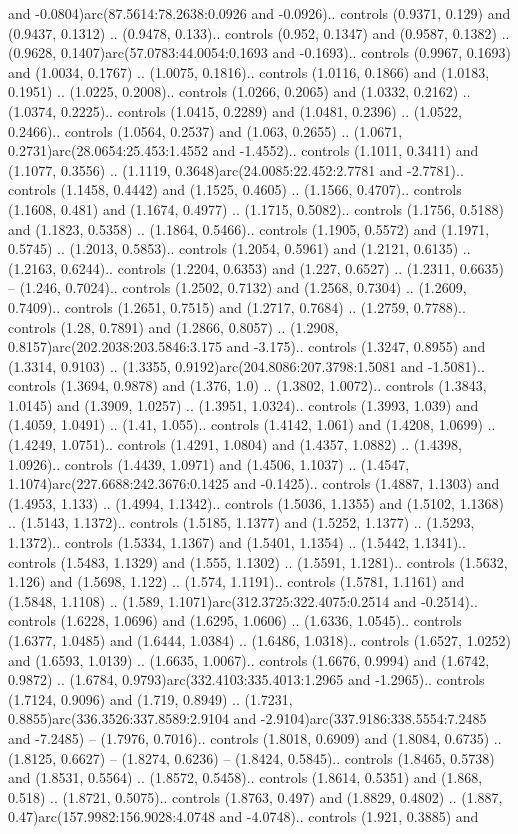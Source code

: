 and -0.0804)arc(87.5614:78.2638:0.0926 and -0.0926).. controls (0.9371, 0.129) and (0.9437, 0.1312) .. (0.9478, 0.133).. controls (0.952, 0.1347) and (0.9587, 0.1382) .. (0.9628, 0.1407)arc(57.0783:44.0054:0.1693 and -0.1693).. controls (0.9967, 0.1693) and (1.0034, 0.1767) .. (1.0075, 0.1816).. controls (1.0116, 0.1866) and (1.0183, 0.1951) .. (1.0225, 0.2008).. controls (1.0266, 0.2065) and (1.0332, 0.2162) .. (1.0374, 0.2225).. controls (1.0415, 0.2289) and (1.0481, 0.2396) .. (1.0522, 0.2466).. controls (1.0564, 0.2537) and (1.063, 0.2655) .. (1.0671, 0.2731)arc(28.0654:25.453:1.4552 and -1.4552).. controls (1.1011, 0.3411) and (1.1077, 0.3556) .. (1.1119, 0.3648)arc(24.0085:22.452:2.7781 and -2.7781).. controls (1.1458, 0.4442) and (1.1525, 0.4605) .. (1.1566, 0.4707).. controls (1.1608, 0.481) and (1.1674, 0.4977) .. (1.1715, 0.5082).. controls (1.1756, 0.5188) and (1.1823, 0.5358) .. (1.1864, 0.5466).. controls (1.1905, 0.5572) and (1.1971, 0.5745) .. (1.2013, 0.5853).. controls (1.2054, 0.5961) and (1.2121, 0.6135) .. (1.2163, 0.6244).. controls (1.2204, 0.6353) and (1.227, 0.6527) .. (1.2311, 0.6635) -- (1.246, 0.7024).. controls (1.2502, 0.7132) and (1.2568, 0.7304) .. (1.2609, 0.7409).. controls (1.2651, 0.7515) and (1.2717, 0.7684) .. (1.2759, 0.7788).. controls (1.28, 0.7891) and (1.2866, 0.8057) .. (1.2908, 0.8157)arc(202.2038:203.5846:3.175 and -3.175).. controls (1.3247, 0.8955) and (1.3314, 0.9103) .. (1.3355, 0.9192)arc(204.8086:207.3798:1.5081 and -1.5081).. controls (1.3694, 0.9878) and (1.376, 1.0) .. (1.3802, 1.0072).. controls (1.3843, 1.0145) and (1.3909, 1.0257) .. (1.3951, 1.0324).. controls (1.3993, 1.039) and (1.4059, 1.0491) .. (1.41, 1.055).. controls (1.4142, 1.061) and (1.4208, 1.0699) .. (1.4249, 1.0751).. controls (1.4291, 1.0804) and (1.4357, 1.0882) .. (1.4398, 1.0926).. controls (1.4439, 1.0971) and (1.4506, 1.1037) .. (1.4547, 1.1074)arc(227.6688:242.3676:0.1425 and -0.1425).. controls (1.4887, 1.1303) and (1.4953, 1.133) .. (1.4994, 1.1342).. controls (1.5036, 1.1355) and (1.5102, 1.1368) .. (1.5143, 1.1372).. controls (1.5185, 1.1377) and (1.5252, 1.1377) .. (1.5293, 1.1372).. controls (1.5334, 1.1367) and (1.5401, 1.1354) .. (1.5442, 1.1341).. controls (1.5483, 1.1329) and (1.555, 1.1302) .. (1.5591, 1.1281).. controls (1.5632, 1.126) and (1.5698, 1.122) .. (1.574, 1.1191).. controls (1.5781, 1.1161) and (1.5848, 1.1108) .. (1.589, 1.1071)arc(312.3725:322.4075:0.2514 and -0.2514).. controls (1.6228, 1.0696) and (1.6295, 1.0606) .. (1.6336, 1.0545).. controls (1.6377, 1.0485) and (1.6444, 1.0384) .. (1.6486, 1.0318).. controls (1.6527, 1.0252) and (1.6593, 1.0139) .. (1.6635, 1.0067).. controls (1.6676, 0.9994) and (1.6742, 0.9872) .. (1.6784, 0.9793)arc(332.4103:335.4013:1.2965 and -1.2965).. controls (1.7124, 0.9096) and (1.719, 0.8949) .. (1.7231, 0.8855)arc(336.3526:337.8589:2.9104 and -2.9104)arc(337.9186:338.5554:7.2485 and -7.2485) -- (1.7976, 0.7016).. controls (1.8018, 0.6909) and (1.8084, 0.6735) .. (1.8125, 0.6627) -- (1.8274, 0.6236) -- (1.8424, 0.5845).. controls (1.8465, 0.5738) and (1.8531, 0.5564) .. (1.8572, 0.5458).. controls (1.8614, 0.5351) and (1.868, 0.518) .. (1.8721, 0.5075).. controls (1.8763, 0.497) and (1.8829, 0.4802) .. (1.887, 0.47)arc(157.9982:156.9028:4.0748 and -4.0748).. controls (1.921, 0.3885) and 